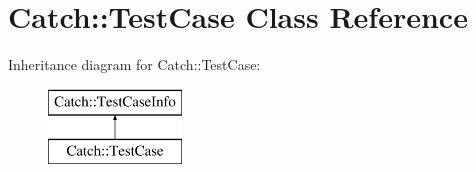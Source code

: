 \hypertarget{classCatch_1_1TestCase}{}\section{Catch\+:\+:Test\+Case Class Reference}
\label{classCatch_1_1TestCase}
Inheritance diagram for Catch\+:\+:Test\+Case\+:\begin{figure}[H]
\begin{center}
\leavevmode
\includegraphics[height=2.000000cm]{classCatch_1_1TestCase}
\end{center}
\end{figure}
